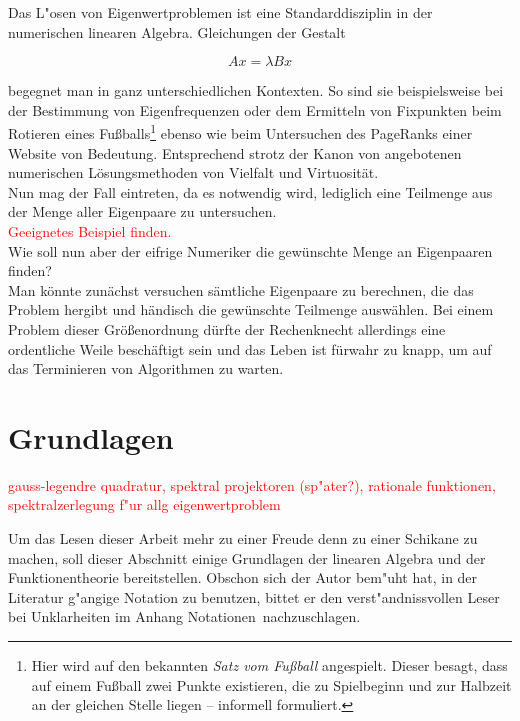 Das L"osen von Eigenwertproblemen ist eine Standarddisziplin in der
numerischen linearen Algebra. Gleichungen der Gestalt

\begin{equation}\label{eq:eigenproblem}
Ax = \lambda Bx
\end{equation}

begegnet man in ganz unterschiedlichen Kontexten. So sind sie beispielsweise
bei der Bestimmung von Eigenfrequenzen oder dem Ermitteln von Fixpunkten beim
Rotieren eines Fußballs\footnote{Hier wird auf den bekannten
\emph{Satz vom Fußball} angespielt. Dieser besagt, dass auf einem Fußball
zwei Punkte existieren, die zu Spielbeginn und zur Halbzeit
an der gleichen Stelle liegen -- informell formuliert.} ebenso wie beim
Untersuchen des PageRanks einer Website von
Bedeutung. Entsprechend strotz der Kanon von angebotenen numerischen
Lösungsmethoden von Vielfalt und Virtuosität.\\

Nun mag der Fall eintreten, da es notwendig wird, lediglich eine Teilmenge
aus der Menge aller Eigenpaare zu untersuchen.\\
\textcolor{red}{Geeignetes Beispiel finden.}\\

Wie soll nun aber der eifrige Numeriker die gewünschte Menge an Eigenpaaren
finden?\\

Man könnte zunächst versuchen sämtliche Eigenpaare zu berechnen, die das Problem
hergibt und händisch die gewünschte Teilmenge auswählen. Bei einem Problem
dieser Größenordnung dürfte der Rechenknecht allerdings eine ordentliche Weile
beschäftigt sein und das Leben ist fürwahr zu knapp, um auf das Terminieren
von Algorithmen zu warten.\\

\section{Grundlagen}

\textcolor{red}{gauss-legendre quadratur, spektral projektoren (sp"ater?), rationale funktionen, spektralzerlegung f"ur allg eigenwertproblem}

Um das Lesen dieser Arbeit mehr zu einer Freude denn zu einer Schikane zu
machen, soll dieser Abschnitt einige Grundlagen der linearen Algebra und
der Funktionentheorie bereitstellen. Obschon sich der Autor bem"uht hat,
in der Literatur g"angige Notation zu benutzen, bittet er den
verst"andnissvollen Leser bei Unklarheiten im Anhang \glqq Notationen\grqq\
nachzuschlagen.\\

